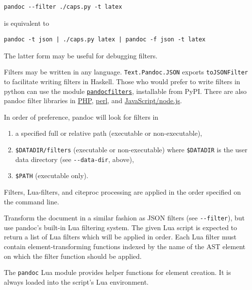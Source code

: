 \documentclass[
  b5paper
]{book}
\begin{document}
\begin{description}
\begin{verbatim}
pandoc --filter ./caps.py -t latex
\end{verbatim}

is equivalent to

\begin{verbatim}
pandoc -t json | ./caps.py latex | pandoc -f json -t latex
\end{verbatim}

The latter form may be useful for debugging filters.

Filters may be written in any language. \texttt{Text.Pandoc.JSON}
exports \texttt{toJSONFilter} to facilitate writing filters in Haskell.
Those who would prefer to write filters in python can use the module
\href{https://github.com/jgm/pandocfilters}{\texttt{pandocfilters}},
installable from PyPI. There are also pandoc filter libraries in
\href{https://github.com/vinai/pandocfilters-php}{PHP},
\href{https://metacpan.org/pod/Pandoc::Filter}{perl}, and
\href{https://github.com/mvhenderson/pandoc-filter-node}{JavaScript/node.js}.

In order of preference, pandoc will look for filters in

\begin{enumerate}
\def\labelenumi{\arabic{enumi}.}
\item
  a specified full or relative path (executable or non-executable),
\item
  \texttt{\$DATADIR/filters} (executable or non-executable) where
  \texttt{\$DATADIR} is the user data directory (see
  \texttt{-\/-data-dir}, above),
\item
  \texttt{\$PATH} (executable only).
\end{enumerate}

Filters, Lua-filters, and citeproc processing are applied in the order
specified on the command line.
\item[\texttt{-L} \emph{SCRIPT}, \texttt{-\/-lua-filter=}\emph{SCRIPT}]
Transform the document in a similar fashion as JSON filters (see
\texttt{-\/-filter}), but use pandoc's built-in Lua filtering system.
The given Lua script is expected to return a list of Lua filters which
will be applied in order. Each Lua filter must contain
element-transforming functions indexed by the name of the AST element on
which the filter function should be applied.

The \texttt{pandoc} Lua module provides helper functions for element
creation. It is always loaded into the script's Lua environment.


\end{description}
\end{document}
